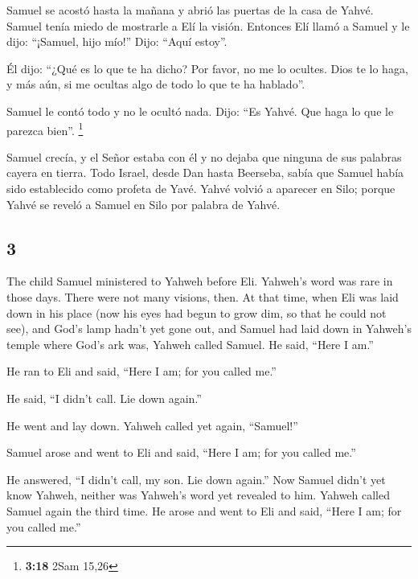 \begin{paracol}{2}
 Samuel se acostó hasta la mañana y abrió las puertas de
la casa de Yahvé. Samuel tenía miedo de mostrarle a Elí la visión.
 Entonces Elí llamó a Samuel y le dijo: ``¡Samuel, hijo
mío!'' Dijo: ``Aquí estoy''.

 Él dijo: ``¿Qué es lo que te ha dicho? Por favor, no me
lo ocultes. Dios te lo haga, y más aún, si me ocultas algo de todo lo
que te ha hablado''.

 Samuel le contó todo y no le ocultó nada. Dijo: ``Es
Yahvé. Que haga lo que le parezca bien''. \footnote{\textbf{3:18} 2Sam
  15,26}

 Samuel crecía, y el Señor estaba con él y no dejaba que
ninguna de sus palabras cayera en tierra.  Todo Israel,
desde Dan hasta Beerseba, sabía que Samuel había sido establecido como
profeta de Yavé.  Yahvé volvió a aparecer en Silo; porque
Yahvé se reveló a Samuel en Silo por palabra de Yahvé.

\switchcolumn
\begin{otherlanguage}{english}

\hypertarget{section-5}{%
\section{3}\label{section-5}}

 The child Samuel ministered to Yahweh before Eli.
Yahweh's word was rare in those days. There were not many visions, then.
 At that time, when Eli was laid down in his place (now
his eyes had begun to grow dim, so that he could not see),
 and God's lamp hadn't yet gone out, and Samuel had laid
down in Yahweh's temple where God's ark was,  Yahweh
called Samuel. He said, ``Here I am.''

 He ran to Eli and said, ``Here I am; for you called me.''

He said, ``I didn't call. Lie down again.''

He went and lay down.  Yahweh called yet again,
``Samuel!''

Samuel arose and went to Eli and said, ``Here I am; for you called me.''

He answered, ``I didn't call, my son. Lie down again.'' 
Now Samuel didn't yet know Yahweh, neither was Yahweh's word yet
revealed to him.  Yahweh called Samuel again the third
time. He arose and went to Eli and said, ``Here I am; for you called
me.''


\end{otherlanguage}
\end{paracol}
